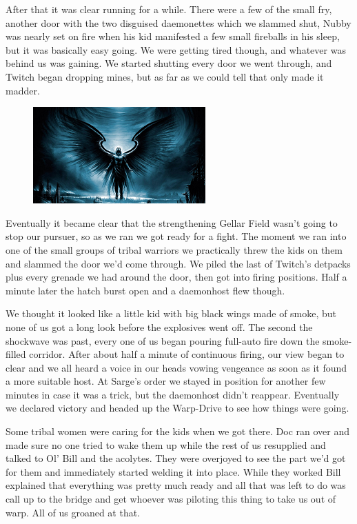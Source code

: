 After that it was clear running for a while. 
There were a few of the small fry, another door with the two disguised daemonettes which we slammed shut, Nubby was nearly set on fire when his kid manifested a few small fireballs in his sleep, but it was basically easy going. 
We were getting tired though, and whatever was behind us was gaining. 
We started shutting every door we went through, and Twitch began dropping mines, but as far as we could tell that only made it madder.

\begin{figure}
	\begin{center}
		\includegraphics[width=\figwidth]{pics/7/40.png}
	\end{center}
\end{figure}
Eventually it became clear that the strengthening Gellar Field wasn’t going to stop our pursuer, so as we ran we got ready for a fight. 
The moment we ran into one of the small groups of tribal warriors we practically threw the kids on them and slammed the door we’d come through. 
We piled the last of Twitch’s detpacks plus every grenade we had around the door, then got into firing positions. 
Half a minute later the hatch burst open and a daemonhost flew though.

We thought it looked like a little kid with big black wings made of smoke, but none of us got a long look before the explosives went off. 
The second the shockwave was past, every one of us began pouring full-auto fire down the smoke-filled corridor. 
After about half a minute of continuous firing, our view began to clear and we all heard a voice in our heads vowing vengeance as soon as it found a more suitable host. 
At Sarge’s order we stayed in position for another few minutes in case it was a trick, but the daemonhost didn’t reappear. 
Eventually we declared victory and headed up the Warp-Drive to see how things were going.

Some tribal women were caring for the kids when we got there. 
Doc ran over and made sure no one tried to wake them up while the rest of us resupplied and talked to Ol’ Bill and the acolytes. 
They were overjoyed to see the part we’d got for them and immediately started welding it into place. 
While they worked Bill explained that everything was pretty much ready and all that was left to do was call up to the bridge and get whoever was piloting this thing to take us out of warp. 
All of us groaned at that.

